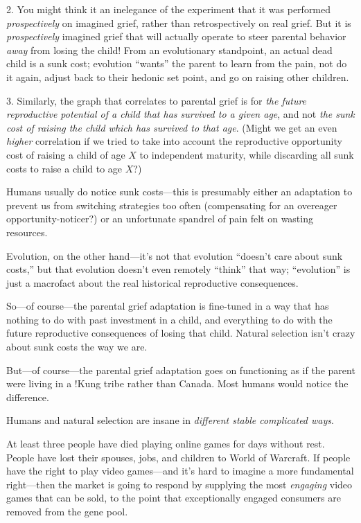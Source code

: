 {{
 2. You might think it an inelegance of the experiment that it was
performed \textit{prospectively} on imagined grief, rather than
retrospectively on real grief. But it is \textit{prospectively}
imagined grief that will actually operate to steer parental behavior
\textit{away} from losing the child! From an evolutionary standpoint,
an actual dead child is a sunk cost; evolution
``wants'' the parent to learn from
the pain, not do it again, adjust back to their hedonic set point, and
go on raising other children.}

{
 3. Similarly, the graph that correlates to parental grief is for
\textit{the future reproductive potential of a child that has survived
to a given age}, and not \textit{the sunk cost of raising the child
which has survived to that age}. (Might we get an even \textit{higher}
correlation if we tried to take into account the reproductive
opportunity cost of raising a child of age $X$ to independent maturity,
while discarding all sunk costs to raise a child to age $X$?)}

{
 Humans usually do notice sunk costs---this is presumably either an
adaptation to prevent us from switching strategies too often
(compensating for an overeager opportunity-noticer?) or an unfortunate
spandrel of pain felt on wasting resources.}

{
 Evolution, on the other hand---it's not that
evolution ``doesn't care about sunk
costs,'' but that evolution doesn't
even remotely ``think'' that way;
``evolution'' is just a macrofact
about the real historical reproductive consequences.}

{
 So---of course---the parental grief adaptation is fine-tuned in a
way that has nothing to do with past investment in a child, and
everything to do with the future reproductive consequences of losing
that child. Natural selection isn't crazy about sunk
costs the way we are.}

{
 But---of course---the parental grief adaptation goes on
functioning as if the parent were living in a !Kung tribe rather than
Canada. Most humans would notice the difference.}

{
 Humans and natural selection are insane in \textit{different
stable complicated ways}.}

\myendsectiontext


\bigskip


{
 At least three people have died playing online games for days
without rest. People have lost their spouses, jobs, and children to
World of Warcraft. If people have the right to play video games---and
it's hard to imagine a more fundamental right---then
the market is going to respond by supplying the most \textit{engaging}
video games that can be sold, to the point that exceptionally engaged
consumers are removed from the gene pool. }

}
